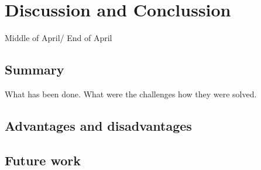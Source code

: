 \documentclass[12pt,a4paper,english%
]{tutthesis}
\begin{document}

 \section {Discussion and Conclussion}
 	Middle of April/ End of April
 	\subsection {Summary}
 	  What has been done. What were the challenges how they were solved.
 	\subsection {Advantages and disadvantages}
 	\subsection {Future work}
 	\nocite{*}
 	
   
  
  
\end{document}
